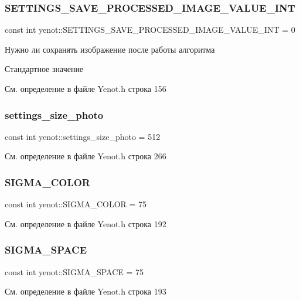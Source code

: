 \subsubsection{\texorpdfstring{S\+E\+T\+T\+I\+N\+G\+S\+\_\+\+S\+A\+V\+E\+\_\+\+P\+R\+O\+C\+E\+S\+S\+E\+D\+\_\+\+I\+M\+A\+G\+E\+\_\+\+V\+A\+L\+U\+E\+\_\+\+I\+NT}{SETTINGS\_SAVE\_PROCESSED\_IMAGE\_VALUE\_INT}}
{\footnotesize\ttfamily const int yenot\+::\+S\+E\+T\+T\+I\+N\+G\+S\+\_\+\+S\+A\+V\+E\+\_\+\+P\+R\+O\+C\+E\+S\+S\+E\+D\+\_\+\+I\+M\+A\+G\+E\+\_\+\+V\+A\+L\+U\+E\+\_\+\+I\+NT = 0}

Нужно ли сохранять изображение после работы алгоритма

Стандартное значение 

См. определение в файле Yenot.\+h строка 156

\mbox{\label{namespaceyenot_a4e9a58fa114bcb3d3ae09fb62129f2c9}} 
\subsubsection{\texorpdfstring{settings\+\_\+size\+\_\+photo}{settings\_size\_photo}}
{\footnotesize\ttfamily const int yenot\+::settings\+\_\+size\+\_\+photo = 512}



См. определение в файле Yenot.\+h строка 266

\mbox{\label{namespaceyenot_affd7404833d15c98fbd85249f43f98da}} 
\subsubsection{\texorpdfstring{S\+I\+G\+M\+A\+\_\+\+C\+O\+L\+OR}{SIGMA\_COLOR}}
{\footnotesize\ttfamily const int yenot\+::\+S\+I\+G\+M\+A\+\_\+\+C\+O\+L\+OR = 75}



См. определение в файле Yenot.\+h строка 192

\mbox{\label{namespaceyenot_ad45191f613b95ca3398e6eab5e202406}} 
\subsubsection{\texorpdfstring{S\+I\+G\+M\+A\+\_\+\+S\+P\+A\+CE}{SIGMA\_SPACE}}
{\footnotesize\ttfamily const int yenot\+::\+S\+I\+G\+M\+A\+\_\+\+S\+P\+A\+CE = 75}



См. определение в файле Yenot.\+h строка 193

